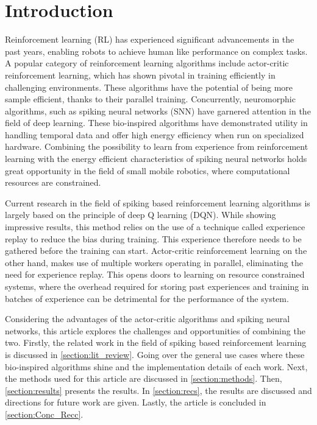 \section{Introduction} \label{section:introduction}
Reinforcement learning (RL) has experienced significant advancements in the past years, enabling robots to achieve human like performance on complex tasks. A popular category of reinforcement learning algorithms include actor-critic reinforcement learning, which has shown pivotal in training efficiently in challenging environments. These algorithms have the potential of being more sample efficient, thanks to their parallel training. Concurrently, neuromorphic algorithms, such as spiking neural networks (SNN) have garnered attention in the field of deep learning. These bio-inspired algorithms have demonstrated utility in handling temporal data and offer high energy efficiency when run on specialized hardware. Combining the possibility to learn from experience from reinforcement learning with the energy efficient characteristics of spiking neural networks holds great opportunity in the field of small mobile robotics, where computational resources are constrained.

Current research in the field of spiking based reinforcement learning algorithms is largely based on the principle of deep Q learning (DQN). While showing impressive results, this method relies on the use of a technique called experience replay to reduce the bias during training. This experience therefore needs to be gathered before the training can start. Actor-critic reinforcement learning on the other hand, makes use of multiple workers operating in parallel, eliminating the need for experience replay. This opens doors to learning on resource constrained systems, where the overhead required for storing past experiences and training in batches of experience can be detrimental for the performance of the system.

Considering the advantages of the actor-critic algorithms and spiking neural networks, this article explores the challenges and opportunities of combining the two. Firstly, the related work in the field of spiking based reinforcement learning is discussed in \autoref{section:lit_review}. Going over the general use cases where these bio-inspired algorithms shine and the implementation details of each work. Next, the methods used for this article are discussed in \autoref{section:methods}. Then, \autoref{section:results} presents the results. In \autoref{section:recs}, the results are discussed and directions for future work are given. Lastly, the article is concluded in \autoref{section:Conc_Recc}.

